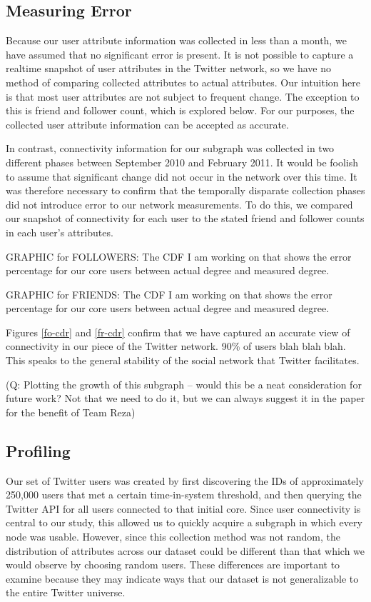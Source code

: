 \subsection{Measuring Error}

Because our user attribute information was collected in less than a month, we have assumed that no significant error is present.  It is not possible to capture a realtime snapshot of user attributes in the Twitter network, so we have no method of comparing collected attributes to actual attributes.  Our intuition here is that most user attributes are not subject to frequent change.  The exception to this is friend and follower count, which is explored below.  For our purposes, the collected user attribute information can be accepted as accurate.

In contrast, connectivity information for our subgraph was collected in two different phases between September 2010 and February 2011.  It would be foolish to assume that significant change did not occur in the network over this time.  It was therefore necessary to confirm that the temporally disparate collection phases did not introduce error to our network measurements.  To do this, we compared our snapshot of connectivity for each user to the stated friend and follower counts in each user's attributes.

GRAPHIC for FOLLOWERS: The CDF I am working on that shows the error percentage for our core users between actual degree and measured degree.

GRAPHIC for FRIENDS: The CDF I am working on that shows the error percentage for our core users between actual degree and measured degree.

Figures \ref{fo-cdr} and \ref{fr-cdr} confirm that we have captured an accurate view of connectivity in our piece of the Twitter network.  90\% of users blah blah blah.  This speaks to the general stability of the social network that Twitter facilitates.

(Q: Plotting the growth of this subgraph -- would this be a neat consideration for future work?  Not that we need to do it, but we can always suggest it in the paper for the benefit of Team Reza)

\subsection{Profiling}

Our set of Twitter users was created by first discovering the IDs of approximately 250,000 users that met a certain time-in-system threshold, and then querying the Twitter API for all users connected to that initial core.  Since user connectivity is central to our study, this allowed us to quickly acquire a subgraph in which every node was usable.  However, since this collection method was not random, the distribution of attributes across our dataset could be different than that which we would observe by choosing random users.  These differences are important to examine because they may indicate ways that our dataset is not generalizable to the entire Twitter universe.

